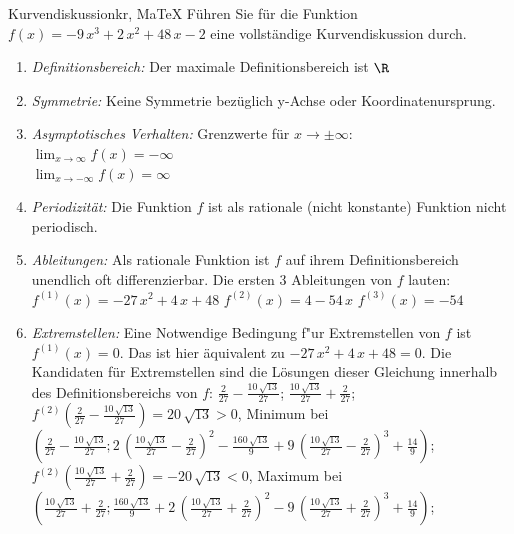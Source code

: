  \providecommand{\MoIl}{(} 
 \providecommand{\MoIr}{)}
 \providecommand{\MIntvlSep}{;} 
 \providecommand{\MElSetSep}{;} 
 \begin{MAufgabe}{Kurvendiskussion}{kr, MaTeX}
 F\"uhren Sie f\"ur die Funktion $f(x)= - 9\, x^3 + 2\, x^2 + 48\, x - 2$ eine vollst\"andige Kurvendiskussion durch.\\ 
 \ifLsg\Loesung
 \begin{enumerate}
 \item \emph{Definitionsbereich:} 
 Der maximale Definitionsbereich ist $\R$\item \emph{Symmetrie:} 
 Keine Symmetrie bez\"uglich y-Achse oder Koordinatenursprung.\item \emph{Asymptotisches Verhalten:} 
 Grenzwerte f\"ur $x\rightarrow \pm \infty$: \\ 
 $\lim_{x\rightarrow \infty} f(x)=- \infty$ \\ 
 $\lim_{x\rightarrow -\infty} f(x)=\infty$ \\ 
 \item \emph{Periodizit\"at:} 
 Die Funktion $f$ ist als rationale (nicht konstante) Funktion nicht periodisch.\item \emph{Ableitungen:} 
 Als rationale Funktion ist $f$ auf ihrem Definitionsbereich unendlich oft differenzierbar. 
 Die ersten 3 Ableitungen von $f$ lauten: \\ 
 $f^{(1)}(x)= - 27\, x^2 + 4\, x + 48$\newline 
  $f^{(2)}(x)=4 - 54\, x$\newline 
  $f^{(3)}(x)=-54$\newline 
  \item \emph{Extremstellen:} 
 Eine Notwendige Bedingung f"ur Extremstellen von $f$ ist $f^{(1)}(x)=0$. 
 Das ist hier \"aquivalent zu $ - 27\, x^2 + 4\, x + 48=0$. 
 Die Kandidaten f\"ur Extremstellen sind die L\"osungen dieser Gleichung innerhalb des Definitionsbereichs von $f$: $\frac{2}{27} - \frac{10\, \sqrt{13}}{27}$; $\frac{10\, \sqrt{13}}{27} + \frac{2}{27}$; \\ 
 $f^{(2)}(\frac{2}{27} - \frac{10\, \sqrt{13}}{27})=20\, \sqrt{13}$$>0$, Minimum bei $(\frac{2}{27} - \frac{10\, \sqrt{13}}{27};2\, {\left(\frac{10\, \sqrt{13}}{27} - \frac{2}{27}\right)}^2 - \frac{160\, \sqrt{13}}{9} + 9\, {\left(\frac{10\, \sqrt{13}}{27} - \frac{2}{27}\right)}^3 + \frac{14}{9})$; \\ 
 $f^{(2)}(\frac{10\, \sqrt{13}}{27} + \frac{2}{27})=- 20\, \sqrt{13}$$<0$, Maximum bei $(\frac{10\, \sqrt{13}}{27} + \frac{2}{27};\frac{160\, \sqrt{13}}{9} + 2\, {\left(\frac{10\, \sqrt{13}}{27} + \frac{2}{27}\right)}^2 - 9\, {\left(\frac{10\, \sqrt{13}}{27} + \frac{2}{27}\right)}^3 + \frac{14}{9})$; \\ 

\end{enumerate}
\end{MAufgabe}
